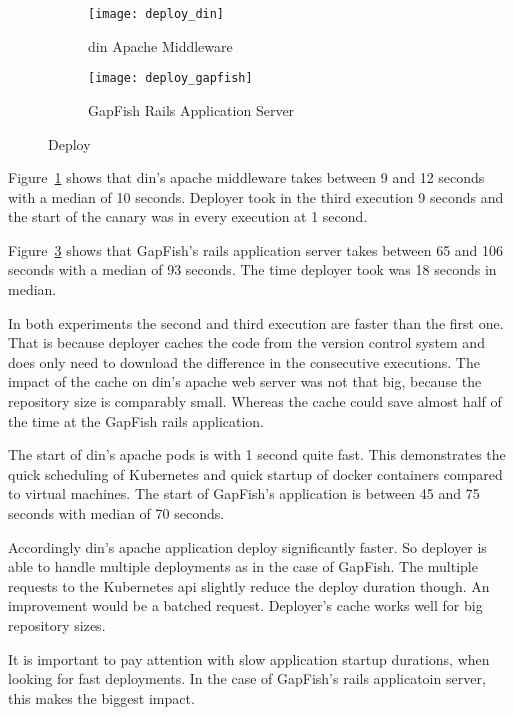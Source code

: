 \begin{figure}[htbp]
  \label{fig:deploy}
  \centering
  \begin{subfigure}{.5\textwidth}
    \texttt{[image: deploy\_din]}
    \caption[DIN]{\gls{din} Apache Middleware}
    \label{fig:deploy_din}
  \end{subfigure}%
  \begin{subfigure}{.5\textwidth}
    \texttt{[image: deploy\_gapfish]}
    \caption[GapFish]{GapFish Rails Application Server}
    \label{fig:deploy_gapfish}
  \end{subfigure}
  \caption[Deploy]{Deploy}
\end{figure}

Figure~\ref{fig:deploy_din} shows that \gls{din}'s apache middleware takes between 9 and 12
seconds with a median of 10 seconds. Deployer took in the third execution 9 seconds and
the start of the canary was in every execution at 1 second.

Figure~\ref{fig:deploy_gapfish} shows that GapFish's rails application server takes
between 65 and 106 seconds with a median of 93 seconds. The time deployer took was 18
seconds in median.

In both experiments the second and third execution are faster than the first one. That is
because deployer caches the code from the version control system and does only need to
download the difference in the consecutive executions. The impact of the cache on \gls{din}'s
apache web server was not that big, because the repository size is comparably
small. Whereas the cache could save almost half of the time at the GapFish rails
application.

The start of \gls{din}'s apache pods is with 1 second quite fast. This demonstrates the quick
scheduling of Kubernetes and quick startup of docker containers compared to virtual
machines. The start of GapFish's application is between 45 and 75 seconds with median of
70 seconds.

Accordingly \gls{din}'s apache application deploy significantly faster. So deployer is able to
handle multiple deployments as in the case of GapFish. The multiple requests to the
Kubernetes api slightly reduce the deploy duration though. An improvement would be a
batched request. Deployer's cache works well for big repository sizes.

It is important to pay attention with slow application startup durations, when looking for
fast deployments. In the case of GapFish's rails applicatoin server, this makes the
biggest impact.

